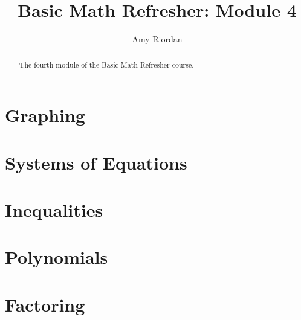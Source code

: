 \documentclass{xourse}
\title{Basic Math Refresher: Module 4}
\author{Amy Riordan}
\begin{document}
\begin{abstract}
    The fourth module of the Basic Math Refresher course.
\end{abstract}
\maketitle

\part{Graphing}


\part{Systems of Equations}


\part{Inequalities}


\part{Polynomials}


\part{Factoring}

\end{document}
